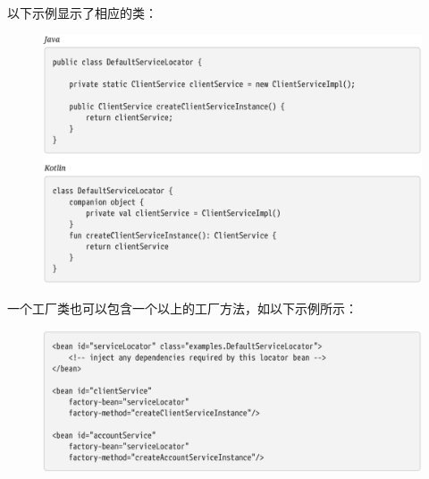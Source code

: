 以下示例显示了相应的类：

\begin{figure}[ht]
    \centering
    \includegraphics[width=1\linewidth]{./Figure/IMG_code_18.png}
\end{figure}

\newpage
一个工厂类也可以包含一个以上的工厂方法，如以下示例所示：

\begin{figure}[ht]
    \centering
    \includegraphics[width=1\linewidth]{./Figure/IMG_code_19.png}
\end{figure}

